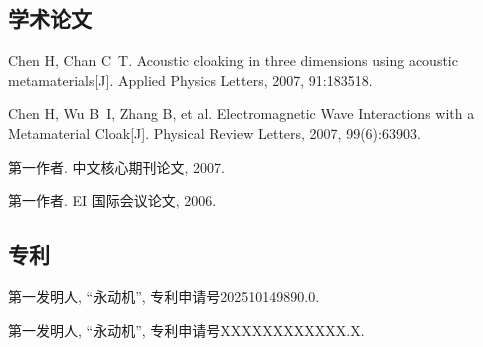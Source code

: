 
\begin{achievements}

\subsection*{学术论文}

\begin{bibliolist}{00}
  \item Chen H, Chan C~T. Acoustic cloaking in three dimensions using acoustic metamaterials[J]. Applied Physics Letters, 2007, 91:183518.
  \item Chen H, Wu B~I, Zhang B, et al. Electromagnetic Wave Interactions with a Metamaterial Cloak[J]. Physical Review Letters, 2007, 99(6):63903.
\end{bibliolist}

\begin{bibliolist*}{00}
  \item 第一作者. 中文核心期刊论文, 2007.
  \item 第一作者. EI 国际会议论文, 2006.
\end{bibliolist*}

\subsection*{专利}

\begin{bibliolist}{00}
  \item 第一发明人, “永动机”, 专利申请号202510149890.0.
\end{bibliolist}

\begin{bibliolist*}{00}
  \item 第一发明人, “永动机”, 专利申请号XXXXXXXXXXXX.X.
\end{bibliolist*}

\end{achievements}
